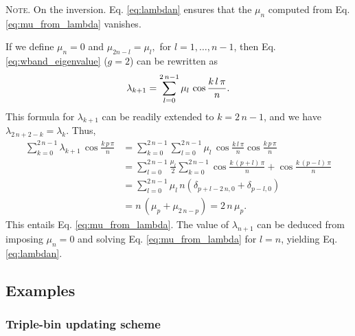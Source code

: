 \documentclass[reprint, superscriptaddress, floatfix]{revtex4-1}
\newcommand{\note}[1]{{\color{DarkGreen}\footnotesize \textsc{Note.} #1}}
\begin{document}
\note{On the inversion.
Eq. \eqref{eq:lambdan}
  ensures that the $\mu_n$
  computed from Eq. \eqref{eq:mu_from_lambda}
  vanishes.

  If we define $\mu_n = 0$ and
  $
    \mu_{ 2 n - l } = \mu_l,
  $
  for
  $l = 1, \dots, n - 1$,
  then Eq. \eqref{eq:wband_eigenvalue} ($g = 2$)
  can be rewritten as
  \begin{align}
    \lambda_{k+1}
    =
    \sum_{ l = 0 }^{ 2 \, n - 1 }
    \mu_l \, \cos \frac{ k \, l \, \pi } { n }.
  \notag
  \end{align}
  This formula for $\lambda_{k+1}$
  can be readily extended to $k = 2 \, n - 1$,
  and we have
  $
    \lambda_{ 2 \, n + 2 - k } = \lambda_k
    .
  $
  Thus,
  $$
  \begin{aligned}
    \sum_{ k = 0 }^{ 2 \, n - 1 }
      \lambda_{ k + 1 } \,
      \cos \frac{ k \, p \, \pi }
                {      n        }
    &=
    \sum_{ k = 0 }^{ 2 \, n - 1 }
      \sum_{ l = 0 }^{ 2 \, n - 1 }
        \mu_l \,
        \cos \frac{ k \, l \, \pi }
                  {      n        }
        \cos \frac{ k \, p \, \pi }
                  {      n        }
    \\
    &=
    \sum_{ l = 0 }^{ 2 \, n - 1 }
      \frac{ \mu_l } { 2 }
      \sum_{ k = 0 }^{ 2 \, n - 1 }
        \cos \frac{ k \, (p + l) \, \pi }
                  {      n        }
                  +
        \cos \frac{ k \, (p - l) \, \pi }
                  {      n        }
    \\
    &=
    \sum_{ l = 0 }^{ 2 \, n - 1 }
      \mu_l \, n \left(
        \delta_{ p + l - 2 \, n, 0 }
        +
        \delta_{ p - l, 0 }
      \right)
    \\
    &=
    n \, \left( \mu_p + \mu_{ 2 \, n - p} \right)
    =
    2 \, n \, \mu_p.
  \end{aligned}
  $$
  This entails Eq. \eqref{eq:mu_from_lambda}.
  The value of $\lambda_{n + 1}$
  can be deduced from
  imposing $\mu_n = 0$
  and solving Eq. \eqref{eq:mu_from_lambda}
  for $l = n$,
  yielding Eq. \eqref{eq:lambdan}.
}


\subsection{Examples}



\subsubsection{\label{sec:nnscheme}
Triple-bin updating scheme}
\end{document}
